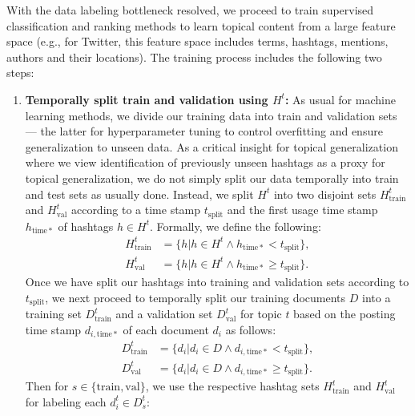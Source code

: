 With the data labeling bottleneck resolved, we proceed to train
supervised classification and ranking methods to learn topical content
from a large feature space (e.g., for Twitter, this feature space
includes terms, hashtags, mentions, authors and their locations). The
training process includes the following two steps:
\begin{enumerate}
\item {\bf Temporally split train and validation using $H^t$:}
As usual for machine learning methods, we divide our training data into
train and validation sets --- the latter for hyperparameter tuning to control
overfitting and ensure generalization to unseen data.  
As a critical insight for topical generalization where we view identification
of previously unseen hashtags as a proxy for topical generalization, we do not simply
split our data temporally into train and test sets as usually done.  Instead,
we split $H^t$ into two disjoint sets $H^t_\mathrm{train}$ and $H^t_\mathrm{val}$ 
according to a time stamp $t_\mathrm{split}$ and the first usage time stamp 
$h_\mathrm{time*}$ of hashtags $h \in H^t$.  Formally, we define the following:
\begin{align*}
H^t_\mathrm{train} & = \{ h | h \in H^t \land h_\mathrm{time*} <    t_\mathrm{split} \} ,  \\
H^t_\mathrm{val}   & = \{ h | h \in H^t \land h_\mathrm{time*} \geq t_\mathrm{split} \} .
\end{align*}
Once we have split our hashtags into training and validation sets
according to $t_\mathrm{split}$, we next proceed to temporally split
our training documents $D$ into a training set $D^t_\mathrm{train}$ and a validation set
$D^t_\mathrm{val}$ for topic $t$ based on the posting
time stamp $d_{i,\mathrm{time*}}$ of each document $d_i$ as follows: 
\begin{align*}
D^t_\mathrm{train} & = \{ d_i | d_i \in D \land d_{i,\mathrm{time*}} <    t_\mathrm{split} \} ,  \\
D^t_\mathrm{val}   & = \{ d_i | d_i \in D \land d_{i,\mathrm{time*}} \geq t_\mathrm{split} \} .
\end{align*}
Then for $s \in \{ \mathrm{train}, \mathrm{val} \}$, we use the respective
hashtag sets $H^t_\mathrm{train}$ and $H^t_\mathrm{val}$ for labeling each $d_{i}^{t} \in D^t_s$:

\end{enumerate}
